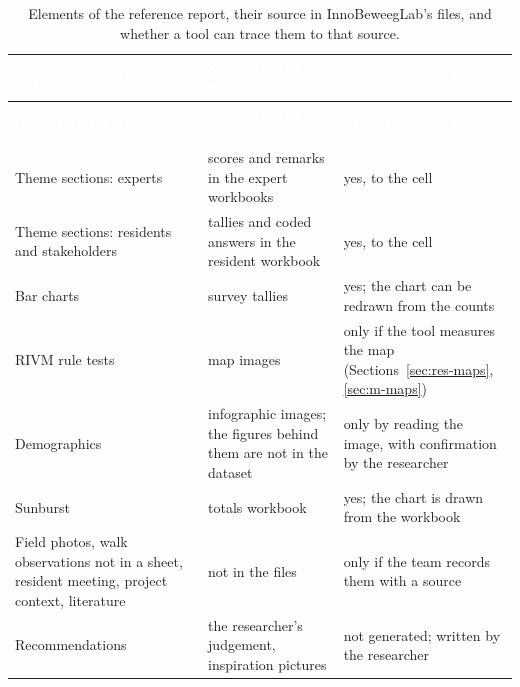\begingroup\renewcommand{\arraystretch}{1.3}
\begin{longtable}{|>{\raggedright\arraybackslash}p{3.6cm}|>{\raggedright\arraybackslash}p{5.4cm}|>{\raggedright\arraybackslash}p{5.2cm}|}
\caption{Elements of the reference report, their source in InnoBeweegLab's files, and whether a tool can trace them to that source.}\label{tab:report-sources}\\
\hline
\cellcolor{navy}\textcolor{white}{\textbf{Report element}} & \cellcolor{navy}\textcolor{white}{\textbf{Source in the files}} & \cellcolor{navy}\textcolor{white}{\textbf{Traceable by a tool?}} \\ \hline
\endfirsthead
\hline
\cellcolor{navy}\textcolor{white}{\textbf{Report element}} & \cellcolor{navy}\textcolor{white}{\textbf{Source in the files}} & \cellcolor{navy}\textcolor{white}{\textbf{Traceable by a tool?}} \\ \hline
\endhead
Theme sections: experts & scores and remarks in the expert workbooks & yes, to the cell \\ \hline
\rowcolor{light}
Theme sections: residents and stakeholders & tallies and coded answers in the resident workbook & yes, to the cell \\ \hline
Bar charts & survey tallies & yes; the chart can be redrawn from the counts \\ \hline
\rowcolor{light}
RIVM rule tests & map images & only if the tool measures the map (Sections~\ref{sec:res-maps}, \ref{sec:m-maps}) \\ \hline
Demographics & infographic images; the figures behind them are not in the dataset & only by reading the image, with confirmation by the researcher \\ \hline
\rowcolor{light}
Sunburst & totals workbook & yes; the chart is drawn from the workbook \\ \hline
Field photos, walk observations not in a sheet, resident meeting, project context, literature & not in the files & only if the team records them with a source \\ \hline
\rowcolor{light}
Recommendations & the researcher's judgement, inspiration pictures & not generated; written by the researcher \\ \hline
\end{longtable}
\endgroup
